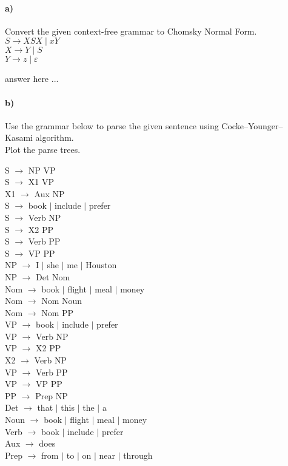 \documentclass[a4paper,12pt]{article}
\begin{document}
\paragraph{a)} Convert the given context-free grammar to Chomsky Normal Form. \\

$ S   \to XSX \mid xY $ \\
$ X   \to Y \mid S $ \\
$ Y   \to z \mid \varepsilon $ \\

\begin{tcolorbox}
answer here ...
\vspace{18cm} %
\end{tcolorbox}


\paragraph{b)} Use the grammar below to parse the given sentence using Cocke–Younger–Kasami algorithm. \\
Plot the parse trees. \\

\begin{multicols}{2}
S $\to$ NP VP \\
S $\to$ X1 VP \\
X1 $\to$ Aux NP \\
S $\to$ book $\mid$ include $\mid$ prefer \\
S $\to$ Verb NP \\
S $\to$ X2 PP \\
S $\to$ Verb PP \\
S $\to$ VP PP \\
NP $\to$ I $\mid$ she $\mid$ me $\mid$ Houston \\
NP $\to$ Det Nom \\
Nom $\to$ book $\mid$ flight $\mid$ meal $\mid$ money \\
Nom $\to$ Nom Noun \\
Nom $\to$ Nom PP \\
VP $\to$ book $\mid$ include $\mid$ prefer \\
VP $\to$ Verb NP \\
VP $\to$ X2 PP \\
X2 $\to$ Verb NP \\
VP $\to$ Verb PP \\
VP $\to$ VP PP \\
PP $\to$ Prep NP \\
Det $\to$ that $\mid$ this $\mid$ the $\mid$ a \\
Noun $\to$ book $\mid$ flight $\mid$ meal $\mid$ money \\
Verb $\to$ book $\mid$ include $\mid$ prefer \\
Aux $\to$ does \\
Prep $\to$ from $\mid$ to $\mid$ on $\mid$ near $\mid$ through \\
\end{multicols}
\end{document}
